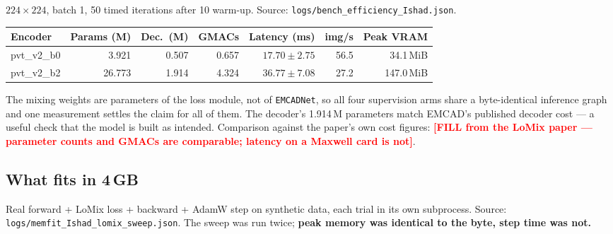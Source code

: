 \documentclass[11pt,a4paper]{article}
\newcommand{\code}[1]{\texttt{\small #1}}
\begin{document}
$224\times224$, batch 1, 50 timed iterations after 10 warm-up. Source:
\code{logs/bench\_efficiency\_Ishad.json}.

\begin{center}
\begin{tabular}{@{}lrrrrrr@{}}
\toprule
\textbf{Encoder} & \textbf{Params (M)} & \textbf{Dec.\ (M)} & \textbf{GMACs} &
\textbf{Latency (ms)} & \textbf{img/s} & \textbf{Peak VRAM} \\
\midrule
pvt\_v2\_b0 & 3.921 & 0.507 & 0.657 & $17.70 \pm 2.75$ & 56.5 & 34.1\,MiB \\
pvt\_v2\_b2 & 26.773 & 1.914 & 4.324 & $36.77 \pm 7.08$ & 27.2 & 147.0\,MiB \\
\bottomrule
\end{tabular}
\end{center}

The mixing weights are parameters of the loss module, not of \code{EMCADNet}, so
all four supervision arms share a byte-identical inference graph and one
measurement settles the claim for all of them. The decoder's 1.914\,M parameters
match EMCAD's published decoder cost --- a useful check that the model is built
as intended. Comparison against the paper's own cost figures:
\textcolor{red}{\textbf{[FILL from the LoMix paper --- parameter counts and
GMACs are comparable; latency on a Maxwell card is not]}}.

\subsection{What fits in 4\,GB}

Real forward + LoMix loss + backward + AdamW step on synthetic data, each trial
in its own subprocess. Source: \code{logs/memfit\_Ishad\_lomix\_sweep.json}. The
sweep was run twice; \textbf{peak memory was identical to the byte, step time
was not.}
\end{document}

